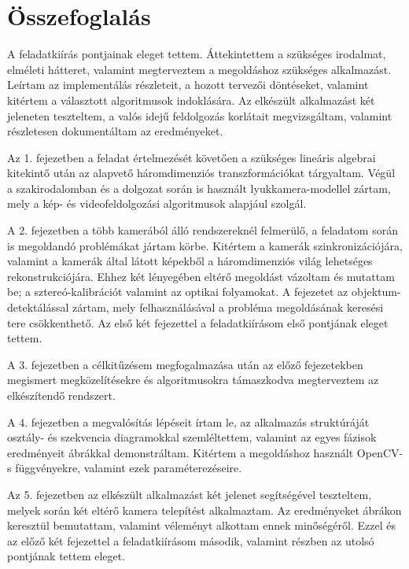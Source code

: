 {\color{blue}

\chapter{Összefoglalás}

A feladatkiírás pontjainak eleget tettem. Áttekintettem a szükséges irodalmat, elméleti hátteret, valamint megterveztem a megoldáshoz szükséges alkalmazást. Leírtam az implementálás részleteit, a hozott tervezői döntéseket, valamint kitértem a választott algoritmusok indoklására. Az elkészült alkalmazást két jeleneten teszteltem, a valós idejű feldolgozás korlátait megvizsgáltam, valamint részletesen dokumentáltam az eredményeket.

Az 1. fejezetben a feladat értelmezését követően a szükséges lineáris algebrai kitekintő után az alapvető háromdimenziós transzformációkat tárgyaltam. Végül a szakirodalomban és a dolgozat során is használt lyukkamera-modellel zártam, mely a kép- és videofeldolgozási algoritmusok alapjául szolgál.

A 2. fejezetben a több kamerából álló rendszereknél felmerülő, a feladatom során is megoldandó problémákat jártam körbe. Kitértem a kamerák szinkronizációjára, valamint a kamerák által látott képekből a háromdimenziós világ lehetséges rekonstrukciójára. Ehhez két lényegében eltérő megoldást vázoltam és mutattam be; a sztereó-kalibrációt valamint az optikai folyamokat. A fejezetet az objektum-detektálással zártam, mely felhasználásával a probléma megoldásának keresési tere csökkenthető. Az első két fejezettel a feladatkiírásom első pontjának eleget tettem.

A 3. fejezetben a célkitűzésem megfogalmazása után az előző fejezetekben megismert megközelítésekre és algoritmusokra támaszkodva megterveztem az elkészítendő rendszert.

A 4. fejezetben a megvalósítás lépéseit írtam le, az alkalmazás struktúráját osztály- és szekvencia diagramokkal szemléltettem, valamint az egyes fázisok eredményeit ábrákkal demonstráltam. Kitértem a megoldáshoz használt OpenCV-s függvényekre, valamint ezek paraméterezéseire.

Az 5. fejezetben az elkészült alkalmazást két jelenet segítségével teszteltem, melyek során két eltérő kamera telepítést alkalmaztam. Az eredményeket ábrákon keresztül bemutattam, valamint véleményt alkottam ennek minőségéről. Ezzel és az előző két fejezettel a feladatkiírásom második, valamint részben az utolsó pontjának tettem eleget.

}

